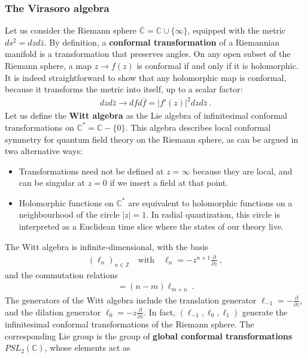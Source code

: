 \documentclass[12pt, a4paper]{article}
\theoremstyle{break}
\begin{document}
\subsubsection{The Virasoro algebra}

Let us consider the Riemann sphere $\overline{\mathbb{C}}=\mathbb{C}\cup \{\infty\}$, equipped with the metric $ds^2 = dzd\bar z$. By definition, a \textbf{conformal transformation} of a Riemannian manifold is a transformation that preserves angles. On any open subset of the Riemann sphere, a map $z\to f(z)$ is conformal if and only if it is holomorphic. It is indeed straightforward to show that any holomorphic map is conformal,
because it transforms the metric into itself, up to a scalar factor: 
\begin{align}
 dzd\bar z\to dfd\bar f = |f'(z)|^2 dzd\bar z\ .
\end{align}
Let us define the \textbf{Witt algebra} as the Lie algebra of infinitesimal conformal transformations on $\mathbb{C}^*= \mathbb{C}-\{0\}$. This algebra describes local conformal symmetry for quantum field theory on the Riemann sphere, as can be argued in two alternative ways:
\begin{itemize}
 \item Transformations need not be defined at $z=\infty$ because they are local, and can be singular at $z=0$ if we insert a field at that point.
 \item Holomorphic functions on $\mathbb{C}^*$ are equivalent to holomorphic functions on a neighbourhood of the circle $|z|=1$. In radial quantization, this circle is interpreted as a Euclidean time slice where the states of our theory live. 
\end{itemize}
The Witt algebra is infinite-dimensional, with the basis 
\begin{align}
 \left(\ell_n\right)_{n\in\mathbb{Z}}  \quad \text{with} \quad \ell_n = -z^{n+1}\frac{\partial}{\partial z}\ ,
 \label{lpz}
\end{align}
and the commutation relations 
\begin{align}
 [\ell_n,\ell_m] = (n-m)\ell_{m+n}\ .
\end{align}
The generators of the Witt algebra include the translation generator $\ell_{-1} = -\frac{\partial}{\partial z}$, and the dilation generator $\ell_0 = -z\frac{\partial}{\partial z}$. In fact, $(\ell_{-1},\ell_0,\ell_1)$ generate the infinitesimal conformal transformations of the Riemann sphere.
The corresponding Lie group is the group of \textbf{global conformal transformations} $PSL_2(\mathbb{C})$, whose elements act as 
\end{document}
